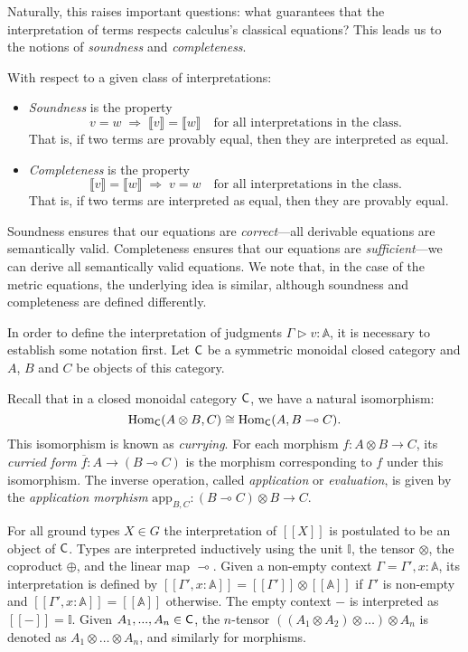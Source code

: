 Naturally, this raises important questions: what guarantees that the interpretation of terms respects calculus's classical equations? This leads us to the notions of \emph{soundness} and \emph{completeness}.

With respect to a given class of interpretations:
\begin{itemize}
  \item \emph{Soundness} is the property 
  \[
  v = w \;\Rightarrow\; \llbracket v \rrbracket = \llbracket w \rrbracket
  \quad \text{for all interpretations in the class.}
  \]
  That is, if two terms are provably equal, then they are interpreted as equal.
  
  \item \emph{Completeness} is the property 
  \[
  \llbracket v \rrbracket = \llbracket w \rrbracket
  \;\Rightarrow\; v = w
  \quad \text{for all interpretations in the class.}
  \]
  That is, if two terms are interpreted as equal, then they are provably equal.
\end{itemize}

Soundness ensures that our equations are \emph{correct}—all derivable equations are semantically valid. Completeness ensures that our equations are \emph{sufficient}—we can derive all semantically valid equations.
We note that, in the case of the metric equations, the underlying idea is similar, although soundness and completeness are defined differently.

\vspace{20pt}

In order to define the interpretation of judgments $\Gamma \triangleright v: \mathbb{A}$, it is necessary to establish some notation first. Let $\mathsf{C}$ be a symmetric monoidal closed category and $A$, $B$ and $C$ be objects of this category. 

Recall that in a closed monoidal category $\mathsf{C}$, we have a natural isomorphism:
\[
\mathrm{Hom}_{\mathsf{C}}(A \otimes B, C) \cong \mathrm{Hom}_{\mathsf{C}}(A, B \multimap C).
\]
This isomorphism is known as \emph{currying}. For each morphism $f \colon A \otimes B \to C$, its \emph{curried form} $\overline{f} \colon A \to (B \multimap C)$ is the morphism corresponding to $f$ under this isomorphism.
The inverse operation, called \emph{application} or \emph{evaluation}, is given by the \emph{application morphism} $\text{app}_{B,C} \colon (B \multimap C) \otimes B \to C$.


For all ground types $X \in G$  the interpretation of $[\![X]\!]$  is postulated  to be an object of $\mathsf{C}$. Types are interpreted inductively using the unit $\mathbb{I}$, the tensor $\otimes$, the coproduct $\oplus$, and the linear map $\multimap$. Given a non-empty context $\Gamma=\Gamma',x: \mathbb{A}$, its interpretation is defined by $[\![\Gamma',x: \mathbb{A}]\!] = [\![\Gamma']\!] \otimes [\![\mathbb{A}]\!]$ if $\Gamma'$ is non-empty and $[\![\Gamma',x: \mathbb{A}]\!] = [\![\mathbb{A}]\!]$ otherwise. The empty context $-$ is interpreted as $[\![-]\!] = \mathbb{I}$. Given $A_{1}, . . . ,A_{n} \in \mathsf{C}$, the $n$-tensor $((A_1 \otimes A_2) \otimes \ldots ) \otimes A_{n}$ is denoted as $A_1 \otimes \ldots \otimes A_{n}$, and similarly for morphisms. 


